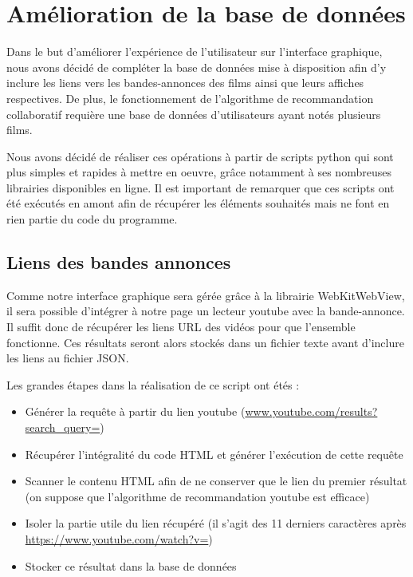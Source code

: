 \newpage
\section{Amélioration de la base de données}
Dans le but d'améliorer l'expérience de l'utilisateur sur l'interface graphique, nous avons décidé de compléter la base de données mise à disposition afin d'y inclure les liens vers les bandes-annonces des films ainsi que leurs affiches respectives.
De plus, le fonctionnement de l'algorithme de recommandation collaboratif requière une base de données d'utilisateurs ayant notés plusieurs films.
\par Nous avons décidé de réaliser ces opérations à partir de scripts python qui sont plus simples et rapides à mettre en oeuvre, grâce notamment à ses nombreuses librairies disponibles en ligne. Il est important de remarquer que ces scripts ont été exécutés en amont afin de récupérer les éléments souhaités mais ne font en rien partie du code du programme.

\subsection{Liens des bandes annonces}
Comme notre interface graphique sera gérée grâce à la librairie WebKitWebView, il sera possible d'intégrer à notre page un lecteur youtube avec la bande-annonce.
Il suffit donc de récupérer les liens URL des vidéos pour que l'ensemble fonctionne. Ces résultats seront alors stockés dans un fichier texte avant d'inclure les liens au fichier JSON.\par
Les grandes étapes dans la réalisation de ce script ont étés :
\begin{itemize}
	\item Générer la requête à partir du lien youtube (\url{www.youtube.com/results?search\_query=})
	\item Récupérer l'intégralité du code HTML et générer l'exécution de cette requête
	\item Scanner le contenu HTML afin de ne conserver que le lien du premier résultat (on suppose que l'algorithme de recommandation youtube est efficace)
	\item Isoler la partie utile du lien récupéré (il s'agit des 11 derniers caractères après \url{https://www.youtube.com/watch?v=})
	\item Stocker ce résultat dans la base de données
\end{itemize}

